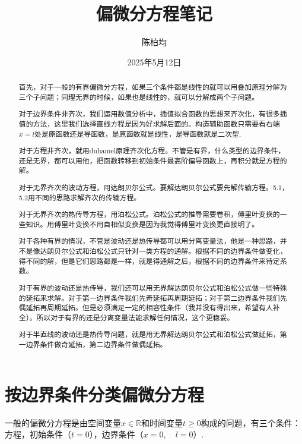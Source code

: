 \documentclass[12pt,a4paper]{article}
\title{偏微分方程笔记}
\author{陈柏均}
\date{2025年5月12日}
\newcommand{\R}{\mathbb{R}}
\numberwithin{subsection}{section}   %
\numberwithin{subsubsection}{subsection}
\theoremstyle{plain}
\theoremstyle{definition}
\theoremstyle{remark}
\theoremstyle{remark}
\begin{document}
	
	\maketitle

 \begin{abstract}
	 首先，对于一般的有界偏微分方程，如果三个条件都是线性的就可以用叠加原理分解为三个子问题；同理无界的时候，如果也是线性的，就可以分解成两个子问题。
	 
	 对于边界条件非齐次，我们运用数值分析中，插值拟合函数的思想来齐次化，有很多插值的方法，这里我们选择直线方程是因为好求解后面的。构造辅助函数只需要看右端$x=l$处是原函数还是导函数，是原函数就是线性，是导函数就是二次型.
	 
	 对于方程非齐次，就用duhamel原理齐次化方程。不管是有界，什么类型的边界条件，还是无界，都可以用他，把函数转移到初始条件最高阶偏导函数上，再积分就是方程的解。
	 
	 对于无界齐次的波动方程，用达朗贝尔公式。要解达朗贝尔公式要先解传输方程。5.1，5.2用不同的思路求解齐次的传输方程。
	 
	 对于无界齐次的热传导方程，用泊松公式。泊松公式的推导需要卷积，傅里叶变换的一些知识。用傅里叶变换不用自相似变换是因为我觉得傅里叶变换更直接明了。
	 
	 对于各种有界的情况，不管是波动还是热传导都可以用分离变量法，他是一种思路，并不是像达朗贝尔公式和泊松公式只针对一类方程的通解。根据不同的边界条件做变化，得不同的解，但是它们思路都是一样，就是得通解之后，根据不同的边界条件来待定系数。
	 
	 对于有界的波动还是热传导，我们还可以用无界解达朗贝尔公式和泊松公式做一些特殊的延拓来求解。对于第一边界条件我们先奇延拓再周期延拓；对于第二边界条件我们先偶延拓再周期延拓。但是必须满足一定的相容性条件（我并没有得出来，希望有人补全）。所以对于有界的还是分离变量法能求解任何情况，这个更稳妥。
	 
	 对于半直线的波动还是热传导问题，就是用无界解达朗贝尔公式和泊松公式做延拓，第一边界条件做奇延拓，第二边界条件做偶延拓。
\end{abstract}


\newpage
	
	\tableofcontents  %
	
	
	\newpage
	\section{按边界条件分类偏微分方程}
	一般的偏微分方程是由空间变量$x \in \R$和时间变量$t \geq 0$构成的问题，有三个条件：方程，初始条件（$t=0$），边界条件（$x=0, \quad l=0$）.
	  
\end{document}

